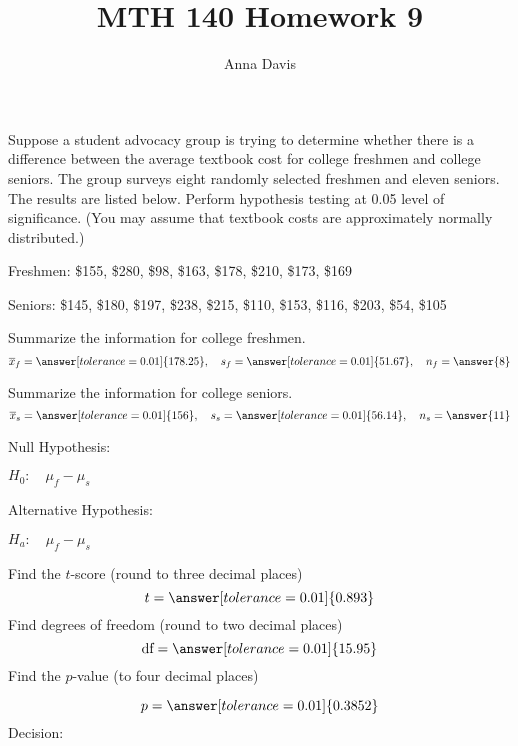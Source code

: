 \documentclass{ximera}
\author{Anna Davis} \title{MTH 140 Homework 9}
\begin{document}
\begin{abstract}

\end{abstract}
\maketitle
 \begin{problem}\label{prob:140hom9prob1}
Suppose a student advocacy group is trying to determine whether there is a difference between the average textbook cost for college freshmen and college seniors.  The group surveys eight randomly selected freshmen and eleven seniors.  The results are listed below.  Perform hypothesis testing at 0.05 level of significance. (You may assume that textbook costs are approximately normally distributed.)

Freshmen: \$155, \$280, \$98, \$163, \$178, \$210, \$173, \$169

Seniors: \$145, \$180, \$197, \$238, \$215, \$110, \$153, \$116, \$203, \$54, \$105  

Summarize the information for college freshmen.
$$\overline{x}_f=\answer[tolerance=0.01]{178.25},\quad s_f=\answer[tolerance=0.01]{51.67},\quad n_f=\answer{8}$$

Summarize the information for college seniors.
$$\overline{x}_s=\answer[tolerance=0.01]{156},\quad s_s=\answer[tolerance=0.01]{56.14},\quad n_s=\answer{11}$$

Null Hypothesis:

$H_0:\quad \mu_f-\mu_s$ 

Alternative Hypothesis:

$H_a:\quad \mu_f-\mu_s$ 

Find the $t$-score (round to three decimal places)
$$t=\answer[tolerance=0.01]{0.893}$$
Find degrees of freedom (round to two decimal places)
$$\mbox{df}=\answer[tolerance=0.01]{15.95}$$
Find the $p$-value (to four decimal places)
\begin{center}  
\end{center}
$$p=\answer[tolerance=0.01]{0.3852}$$
Decision:

\begin{multipleChoice} 
\end{multipleChoice}  


\end{problem}
\end{document}
